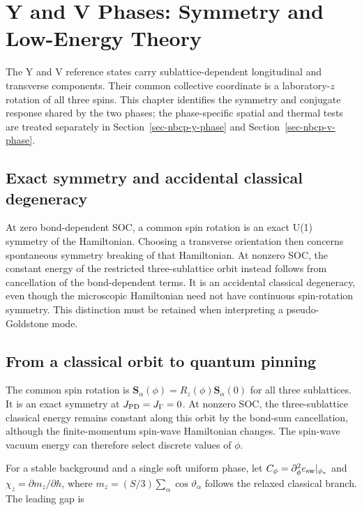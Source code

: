 \clearpage

\section{Y and V Phases: Symmetry and Low-Energy
Theory}\label{sec-nbcp-yv-low-energy}

The Y and V reference states carry sublattice-dependent longitudinal and
transverse components. Their common collective coordinate is a
laboratory-\(z\) rotation of all three spins. This chapter identifies
the symmetry and conjugate response shared by the two phases; the
phase-specific spatial and thermal tests are treated separately in
Section~\ref{sec-nbcp-y-phase} and Section~\ref{sec-nbcp-v-phase}.

\subsection{Exact symmetry and accidental classical
degeneracy}\label{exact-symmetry-and-accidental-classical-degeneracy}

At zero bond-dependent SOC, a common spin rotation is an exact U(1)
symmetry of the Hamiltonian. Choosing a transverse orientation then
concerns spontaneous symmetry breaking of that Hamiltonian. At nonzero
SOC, the constant energy of the restricted three-sublattice orbit
instead follows from cancellation of the bond-dependent terms. It is an
accidental classical degeneracy, even though the microscopic Hamiltonian
need not have continuous spin-rotation symmetry. This distinction must
be retained when interpreting a pseudo-Goldstone mode.

\subsection{From a classical orbit to quantum
pinning}\label{from-a-classical-orbit-to-quantum-pinning}

The common spin rotation is
\(\mathbf S_\alpha(\phi)=R_z(\phi)\mathbf S_\alpha(0)\) for all three
sublattices. It is an exact symmetry at \(J_{\rm PD}=J_\Gamma=0\). At
nonzero SOC, the three-sublattice classical energy remains constant
along this orbit by the bond-sum cancellation, although the
finite-momentum spin-wave Hamiltonian changes. The spin-wave vacuum
energy can therefore select discrete values of \(\phi\).

For a stable background and a single soft uniform phase, let
\(C_\phi=\partial_\phi^2e_{\rm sw}|_{\phi_*}\) and
\(\chi_z=\partial m_z/\partial h\), where
\(m_z=(S/3)\sum_\alpha\cos\vartheta_\alpha\) follows the relaxed
classical branch. The leading gap is

